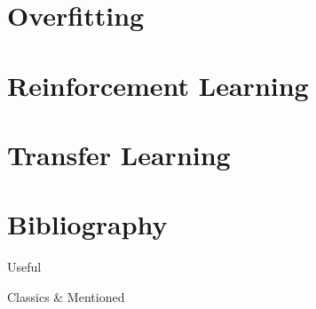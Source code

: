 \documentclass{beamer}
\begin{document}
\section{Overfitting}

\section{Reinforcement Learning}

\section{Transfer Learning}


\section{Bibliography}
\begin{frame}{Useful}
	\begin{itemize}
	\end{itemize}
\end{frame}

\begin{frame}{Classics \& Mentioned}
	\begin{itemize}
	\end{itemize}
\end{frame}
\end{document}
